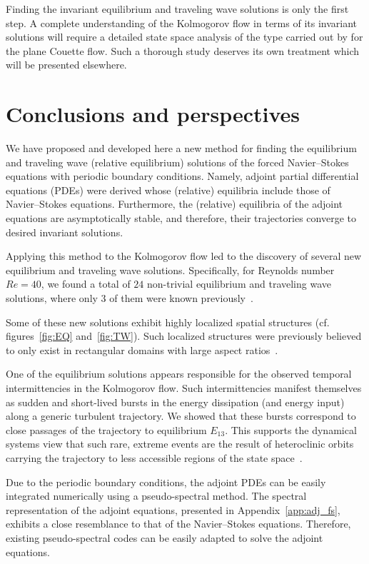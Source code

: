 \documentclass{jfm}
\begin{document}
Finding the invariant equilibrium and traveling wave solutions is only the first step.
A complete understanding of the Kolmogorov flow in terms of its invariant solutions
will require a detailed state space analysis of the type carried out by for
the plane Couette flow. Such a thorough study deserves its own treatment which will be
presented elsewhere.

\section{Conclusions and perspectives}
\label{sec:conclude}
We have  proposed and developed here a new
method for finding the equilibrium and traveling wave (relative
equilibrium) solutions of
the forced Navier--Stokes equations with periodic boundary conditions.
Namely, adjoint partial differential equations (PDEs) were derived whose (relative) equilibria
include those of Navier--Stokes equations. Furthermore, the (relative) equilibria of the adjoint
equations are asymptotically stable, and therefore, their trajectories converge to desired
invariant
solutions.

Applying this method to the Kolmogorov flow led to the discovery of several new
equilibrium and traveling wave solutions. Specifically, for Reynolds number $Re=40$,
we found a total of $24$ non-trivial equilibrium and traveling wave solutions,
where only $3$ of them were known previously~\citep{CK13}.

Some of these new solutions exhibit highly localized spatial structures
(cf. figures~\ref{fig:EQ} and~\ref{fig:TW}). Such localized structures were
previously believed to only exist in rectangular domains with
large aspect ratios~\citep{SGB10,LK14}.

One of the equilibrium solutions appears responsible for the
observed temporal intermittencies in the Kolmogorov flow. Such intermittencies manifest
themselves as sudden and short-lived bursts in the energy dissipation (and energy input)
along a generic turbulent trajectory. We showed that these bursts correspond to
close passages of the trajectory to equilibrium $E_{13}$. This supports the
dynamical systems view that such rare, extreme events are the result of heteroclinic
orbits carrying the trajectory to less accessible regions of the state space~\citep{holmes93}.

Due to the periodic boundary conditions, the adjoint PDEs can be easily integrated numerically using
a pseudo-spectral method. The spectral representation of the adjoint equations, presented
in Appendix~\ref{app:adj_fs}, exhibits a close resemblance to that of the Navier--Stokes equations.
Therefore, existing pseudo-spectral codes can be easily adapted to solve the adjoint equations.
\end{document}
